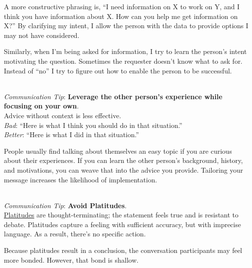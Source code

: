 A more constructive phrasing is, ``I need information on X to work on Y, and I think you have information about X. How can you help me get information on X?'' By clarifying my intent, I allow the person with the data to provide options I may not have considered.

Similarly, when I'm being asked for information, I try to learn the person's intent motivating the question. Sometimes the requester doesn't know what to ask for. Instead of ``no'' I try to figure out how to enable the person to be successful. 

\ \\
\textit{Communication Tip}: \textbf{Leverage the other person's experience while focusing on your own\label{sec:advice}}.\\
Advice without context is less effective.\\
\textit{Bad}: ``Here is what I think you should do in that situation.''\\
\textit{Better}: ``Here is what I did in that situation.''

People usually find talking about themselves an easy topic if you are curious about their experiences. 
If you can learn the other person's background, history, and motivations, you can weave that into the advice you provide. 
Tailoring your message increases the likelihood of implementation. 

\ \\
\textit{Communication Tip}: 
\textbf{Avoid Platitudes\label{sec:platitudes}}.\\
\href{https://en.wikipedia.org/wiki/Platitude}{Platitudes}
are \gls{thought-terminating}; 
\iftoggle{glossaryinmargin}{\marginpar{[Glossary]}}{} the statement feels true and is resistant to debate. Platitudes capture a feeling with sufficient accuracy, but with imprecise language. As a result, there's no specific action.

Because platitudes result in a conclusion, the conversation participants may feel more bonded. However, that bond is shallow.

